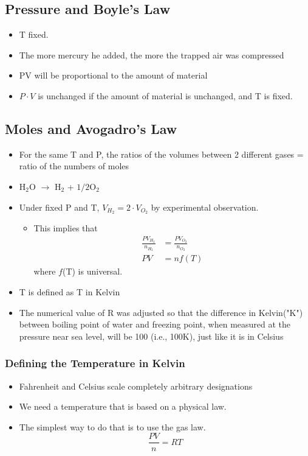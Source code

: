 \documentclass[10pt]{article}
\begin{document}
\subsection*{Pressure and Boyle's Law}
\begin{itemize}
    \item T fixed.
    \item The more mercury he added, the more the trapped air was compressed
    \item PV will be proportional to the amount of material
    \item $P \cdot V$ is unchanged if the amount of material is unchanged, and T is fixed.
\end{itemize}

\subsection*{Moles and Avogadro's Law}
\begin{itemize}
    \item For the same T and P, the ratios of the volumes between 2 different gases = ratio of the numbers of moles
    \item H$_2$O $\rightarrow$ H$_2$ + $1/2$O$_2$
    \item Under fixed P and T, $V_{H_2} = 2 \cdot V_{O_2}$ by experimental observation.
    \begin{itemize}
        \item This implies that 
            \begin{align*}
                \frac{PV_{H_2}}{n_{H_2}} &= \frac{PV_{O_2}}{n_{O_2}}\\
                PV &= nf(T)
            \end{align*}
            where $f$(T) is universal.
    \end{itemize}
    \item T is defined as T in Kelvin
    \item The numerical value of R was adjusted so that the difference in Kelvin("K") between boiling point of water and freezing point, when measured at the pressure near sea level, will be 100 (i.e., 100K), just like it is in Celsius
\end{itemize}
\subsubsection*{Defining the Temperature in Kelvin}
\begin{itemize}
\item Fahrenheit and Celsius scale completely arbitrary designations
\item We need a temperature that is based on a physical law.
\item The simplest way to do that is to use the gas law.
    \[\frac{PV}{n} = RT\]
\end{itemize}
\end{document}
